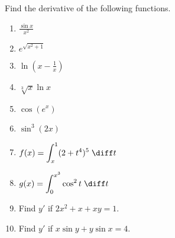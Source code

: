 Find the derivative of the following functions.
\begin{multicols}{2}
\begin{enumerate}
\item ${\displaystyle \frac{\sin x}{x^2}}$

\item ${\displaystyle e^{\sqrt{x^2 + 1}}}$

\item ${\displaystyle \ln \left(x-\frac{1}{x} \right)}$

\item ${\displaystyle \sqrt[3]{x} \ln x}$

\item ${\displaystyle \cos(e^x)}$

\item ${\displaystyle \sin^3(2x)}$

\item ${\displaystyle f(x) = \int_x^1 (2+t^4)^5 \; \diff t}$

\item ${\displaystyle g(x) = \int_{0}^{x^3} \cos^2 t \; \diff t}$

\item Find $y'$ if $2x^2 + x + xy = 1$.

\item Find $y'$ if $x \sin y + y \sin x = 4$.

\end{enumerate}
\end{multicols}
